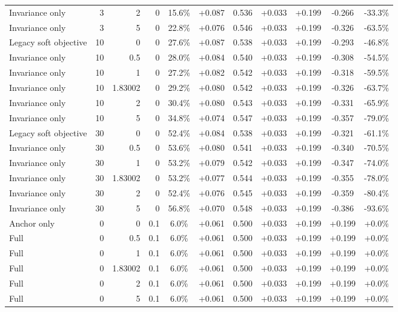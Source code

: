 \begin{table}[htbp]
\begin{tabular}{lrrrccccccc}
Invariance only & 3 & 2 & 0 & 15.6\% & +0.087 & 0.536 & +0.033 & +0.199 & -0.266 & -33.3\% \\
Invariance only & 3 & 5 & 0 & 22.8\% & +0.076 & 0.546 & +0.033 & +0.199 & -0.326 & -63.5\% \\
Legacy soft objective & 10 & 0 & 0 & 27.6\% & +0.087 & 0.538 & +0.033 & +0.199 & -0.293 & -46.8\% \\
Invariance only & 10 & 0.5 & 0 & 28.0\% & +0.084 & 0.540 & +0.033 & +0.199 & -0.308 & -54.5\% \\
Invariance only & 10 & 1 & 0 & 27.2\% & +0.082 & 0.542 & +0.033 & +0.199 & -0.318 & -59.5\% \\
Invariance only & 10 & 1.83002 & 0 & 29.2\% & +0.080 & 0.542 & +0.033 & +0.199 & -0.326 & -63.7\% \\
Invariance only & 10 & 2 & 0 & 30.4\% & +0.080 & 0.543 & +0.033 & +0.199 & -0.331 & -65.9\% \\
Invariance only & 10 & 5 & 0 & 34.8\% & +0.074 & 0.547 & +0.033 & +0.199 & -0.357 & -79.0\% \\
Legacy soft objective & 30 & 0 & 0 & 52.4\% & +0.084 & 0.538 & +0.033 & +0.199 & -0.321 & -61.1\% \\
Invariance only & 30 & 0.5 & 0 & 53.6\% & +0.080 & 0.541 & +0.033 & +0.199 & -0.340 & -70.5\% \\
Invariance only & 30 & 1 & 0 & 53.2\% & +0.079 & 0.542 & +0.033 & +0.199 & -0.347 & -74.0\% \\
Invariance only & 30 & 1.83002 & 0 & 53.2\% & +0.077 & 0.544 & +0.033 & +0.199 & -0.355 & -78.0\% \\
Invariance only & 30 & 2 & 0 & 52.4\% & +0.076 & 0.545 & +0.033 & +0.199 & -0.359 & -80.4\% \\
Invariance only & 30 & 5 & 0 & 56.8\% & +0.070 & 0.548 & +0.033 & +0.199 & -0.386 & -93.6\% \\
Anchor only & 0 & 0 & 0.1 & 6.0\% & +0.061 & 0.500 & +0.033 & +0.199 & +0.199 & +0.0\% \\
Full & 0 & 0.5 & 0.1 & 6.0\% & +0.061 & 0.500 & +0.033 & +0.199 & +0.199 & +0.0\% \\
Full & 0 & 1 & 0.1 & 6.0\% & +0.061 & 0.500 & +0.033 & +0.199 & +0.199 & +0.0\% \\
Full & 0 & 1.83002 & 0.1 & 6.0\% & +0.061 & 0.500 & +0.033 & +0.199 & +0.199 & +0.0\% \\
Full & 0 & 2 & 0.1 & 6.0\% & +0.061 & 0.500 & +0.033 & +0.199 & +0.199 & +0.0\% \\
Full & 0 & 5 & 0.1 & 6.0\% & +0.061 & 0.500 & +0.033 & +0.199 & +0.199 & +0.0\% \\

\end{tabular}
\end{table}
